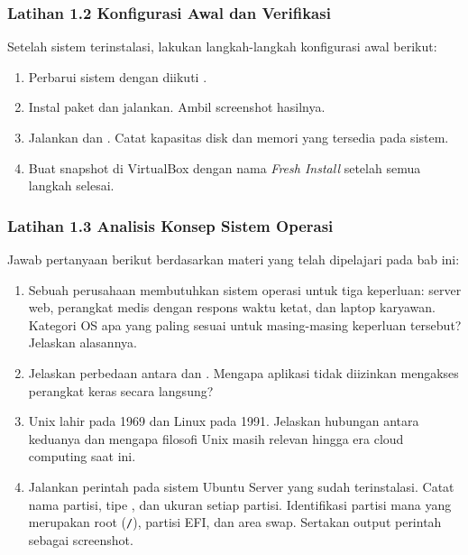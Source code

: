 \subsubsection*{Latihan 1.2 Konfigurasi Awal dan Verifikasi}
Setelah sistem terinstalasi, lakukan langkah-langkah konfigurasi awal berikut:
\begin{enumerate}
    \item Perbarui sistem dengan  diikuti .
    \item Instal paket  dan jalankan. Ambil screenshot hasilnya.
    \item Jalankan  dan . Catat kapasitas disk dan memori yang
    tersedia pada sistem.
    \item Buat snapshot di VirtualBox dengan nama \textit{Fresh Install} setelah semua
    langkah selesai.
\end{enumerate}


\subsubsection*{Latihan 1.3 Analisis Konsep Sistem Operasi}
Jawab pertanyaan berikut berdasarkan materi yang telah dipelajari pada bab ini:
\begin{enumerate}
    \item Sebuah perusahaan membutuhkan sistem operasi untuk tiga keperluan: server web,
    perangkat medis dengan respons waktu ketat, dan laptop karyawan. Kategori OS apa
    yang paling sesuai untuk masing-masing keperluan tersebut? Jelaskan alasannya.
    \item Jelaskan perbedaan antara  dan . Mengapa aplikasi
    tidak diizinkan mengakses perangkat keras secara langsung?
    \item Unix lahir pada 1969 dan Linux pada 1991. Jelaskan hubungan antara keduanya
    dan mengapa filosofi Unix masih relevan hingga era cloud computing saat ini.
    \item Jalankan perintah  pada sistem Ubuntu Server yang sudah
    terinstalasi. Catat nama partisi, tipe , dan ukuran setiap partisi.
    Identifikasi partisi mana yang merupakan root (\texttt{/}), partisi EFI, dan area
    swap. Sertakan output perintah sebagai screenshot.
\end{enumerate}
